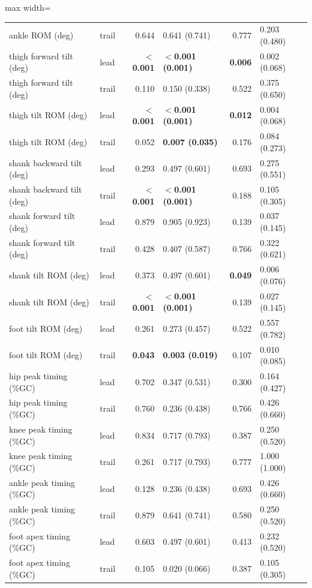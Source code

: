 \begin{adjustbox}{max width=\textwidth}
{\begin{tabular}{llrlrl}
ankle ROM (deg) & trail & 0.644 & 0.641 (0.741) & 0.777 & 0.203 (0.480) \\
thigh forward tilt (deg) & lead & \textbf{$<$0.001} & \textbf{$<$0.001 (0.001)} & \textbf{0.006} & 0.002 (0.068) \\
thigh forward tilt (deg) & trail & 0.110 & 0.150 (0.338) & 0.522 & 0.375 (0.650) \\
thigh tilt ROM (deg) & lead & \textbf{$<$0.001} & \textbf{$<$0.001 (0.001)} & \textbf{0.012} & 0.004 (0.068) \\
thigh tilt ROM (deg) & trail & 0.052 & \textbf{0.007 (0.035)} & 0.176 & 0.084 (0.273) \\
shank backward tilt (deg) & lead & 0.293 & 0.497 (0.601) & 0.693 & 0.275 (0.551) \\
shank backward tilt (deg) & trail & \textbf{$<$0.001} & \textbf{$<$0.001 (0.001)} & 0.188 & 0.105 (0.305) \\
shank forward tilt (deg) & lead & 0.879 & 0.905 (0.923) & 0.139 & 0.037 (0.145) \\
shank forward tilt (deg) & trail & 0.428 & 0.407 (0.587) & 0.766 & 0.322 (0.621) \\
shank tilt ROM (deg) & lead & 0.373 & 0.497 (0.601) & \textbf{0.049} & 0.006 (0.076) \\
shank tilt ROM (deg) & trail & \textbf{$<$0.001} & \textbf{$<$0.001 (0.001)} & 0.139 & 0.027 (0.145) \\
foot tilt ROM (deg) & lead & 0.261 & 0.273 (0.457) & 0.522 & 0.557 (0.782) \\
foot tilt ROM (deg) & trail & \textbf{0.043} & \textbf{0.003 (0.019)} & 0.107 & 0.010 (0.085) \\
hip peak timing (\%GC) & lead & 0.702 & 0.347 (0.531) & 0.300 & 0.164 (0.427) \\
hip peak timing (\%GC) & trail & 0.760 & 0.236 (0.438) & 0.766 & 0.426 (0.660) \\
knee peak timing (\%GC) & lead & 0.834 & 0.717 (0.793) & 0.387 & 0.250 (0.520) \\
knee peak timing (\%GC) & trail & 0.261 & 0.717 (0.793) & 0.777 & 1.000 (1.000) \\
ankle peak timing (\%GC) & lead & 0.128 & 0.236 (0.438) & 0.693 & 0.426 (0.660) \\
ankle peak timing (\%GC) & trail & 0.879 & 0.641 (0.741) & 0.580 & 0.250 (0.520) \\
foot apex timing (\%GC) & lead & 0.603 & 0.497 (0.601) & 0.413 & 0.232 (0.520) \\
foot apex timing (\%GC) & trail & 0.105 & 0.020 (0.066) & 0.387 & 0.105 (0.305) \\

\end{tabular}}
\end{adjustbox}
